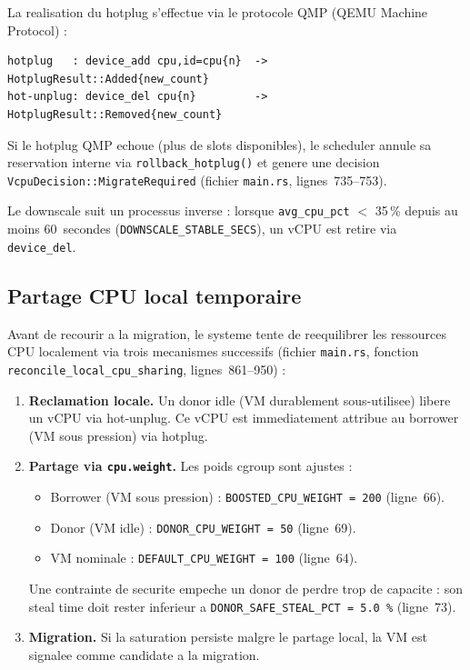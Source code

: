 La realisation du hotplug s'effectue via le protocole QMP (QEMU Machine Protocol) :

\begin{verbatim}
hotplug   : device_add cpu,id=cpu{n}  -> HotplugResult::Added{new_count}
hot-unplug: device_del cpu{n}         -> HotplugResult::Removed{new_count}
\end{verbatim}

Si le hotplug QMP echoue (plus de slots disponibles), le scheduler annule sa reservation interne via \texttt{rollback\_hotplug()} et genere une decision \texttt{VcpuDecision::MigrateRequired} (fichier \texttt{main.rs}, lignes~735--753).

Le downscale suit un processus inverse : lorsque \texttt{avg\_cpu\_pct} $<$ 35\,\% depuis au moins 60~secondes (\texttt{DOWNSCALE\_STABLE\_SECS}), un vCPU est retire via \texttt{device\_del}.

\subsection{Partage CPU local temporaire}
\label{subsec:partage-cpu}

Avant de recourir a la migration, le systeme tente de reequilibrer les ressources CPU localement via trois mecanismes successifs (fichier \texttt{main.rs}, fonction \texttt{reconcile\_local\_cpu\_sharing}, lignes~861--950) :

\begin{enumerate}
    \item \textbf{Reclamation locale.} Un donor idle (VM durablement sous-utilisee) libere un vCPU via hot-unplug. Ce vCPU est immediatement attribue au borrower (VM sous pression) via hotplug.
    \item \textbf{Partage via \texttt{cpu.weight}.} Les poids cgroup sont ajustes :
    \begin{itemize}
        \item Borrower (VM sous pression) : \texttt{BOOSTED\_CPU\_WEIGHT = 200} (ligne~66).
        \item Donor (VM idle) : \texttt{DONOR\_CPU\_WEIGHT = 50} (ligne~69).
        \item VM nominale : \texttt{DEFAULT\_CPU\_WEIGHT = 100} (ligne~64).
    \end{itemize}
    Une contrainte de securite empeche un donor de perdre trop de capacite : son steal time doit rester inferieur a \texttt{DONOR\_SAFE\_STEAL\_PCT = 5.0\,\%} (ligne~73).
    \item \textbf{Migration.} Si la saturation persiste malgre le partage local, la VM est signalee comme candidate a la migration.
\end{enumerate}


